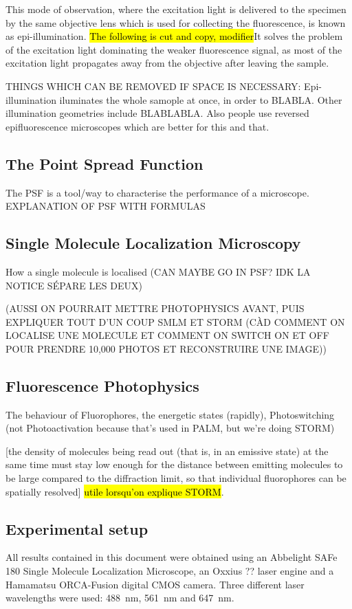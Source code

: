 This mode of observation, where the excitation light is delivered to the specimen by the same objective lens which is used for collecting the fluorescence, 
is known as epi-illumination.
\hl{The following is cut and copy, modifier}It solves the problem of the excitation light dominating the weaker fluorescence signal, as most of the excitation light propagates away from the objective after leaving  the sample.

THINGS WHICH CAN BE REMOVED IF SPACE IS NECESSARY:
Epi-illumination iluminates the whole samople at once, in order to BLABLA. 
Other illumination geometries include BLABLABLA.
Also people use reversed epifluorescence microscopes which are better for this and that.



\subsection{The Point Spread Function}
The PSF is a tool/way to characterise the performance of a microscope.
EXPLANATION OF PSF WITH FORMULAS


\subsection{Single Molecule Localization Microscopy}
How a single molecule is localised (CAN MAYBE GO IN PSF? IDK LA NOTICE SÉPARE LES DEUX)

(AUSSI ON POURRAIT METTRE PHOTOPHYSICS AVANT, PUIS EXPLIQUER TOUT D'UN COUP SMLM ET STORM (CÀD COMMENT ON LOCALISE UNE MOLECULE ET COMMENT ON SWITCH ON ET OFF POUR PRENDRE 10,000 PHOTOS ET RECONSTRUIRE UNE IMAGE))


\subsection{Fluorescence Photophysics}
The behaviour of Fluorophores, the energetic states (rapidly), Photoswitching (not Photoactivation because that's used in PALM, but we're doing STORM)

[the density of molecules being read out
    (that is, in an emissive state) at the same time must stay low
    enough for the distance between emitting molecules to be large
    compared to the diﬀraction limit, so that individual fluorophores
    can be spatially resolved] \hl{utile lorsqu'on explique STORM}.

\subsection{Experimental setup}
All results contained in this document were obtained using an Abbelight SAFe 180 Single Molecule Localization Microscope, an Oxxius ?? laser engine and a Hamamatsu ORCA-Fusion digital CMOS camera.
Three different laser wavelengths were used: \mbox{488 nm}, \mbox{561 nm} and \mbox{647 nm}.

